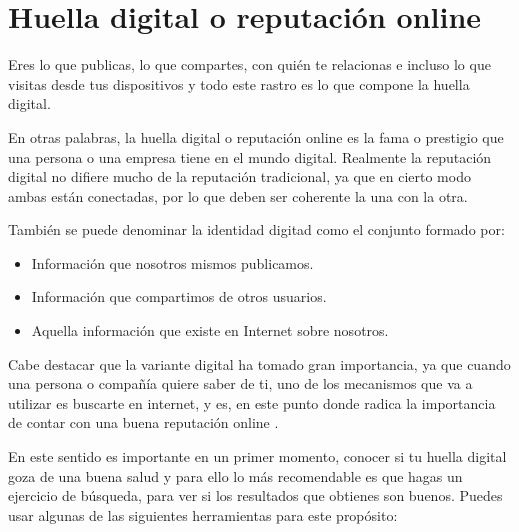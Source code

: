 \documentclass[
  a4paper,
  openany]{book}
\begin{document}
\hypertarget{huella-digital-o-reputaciuxf3n-online}{%
\section{Huella digital o reputación online}\label{huella-digital-o-reputaciuxf3n-online}}

Eres lo que publicas, lo que compartes, con quién te relacionas e incluso lo que visitas desde tus dispositivos y todo este rastro es lo que compone la huella digital.

En otras palabras, la huella digital o reputación online es la fama o prestigio que una persona o una empresa tiene en el mundo digital. Realmente la reputación digital no difiere mucho de la reputación tradicional, ya que en cierto modo ambas están conectadas, por lo que deben ser coherente la una con la otra.

También se puede denominar la identidad digitad como el conjunto formado por:

\begin{itemize}
\item
  Información que nosotros mismos publicamos.
\item
  Información que compartimos de otros usuarios.
\item
  Aquella información que existe en Internet sobre nosotros.
\end{itemize}

Cabe destacar que la variante digital ha tomado gran importancia, ya que cuando una persona o compañía quiere saber de ti, uno de los mecanismos que va a utilizar es buscarte en internet, y es, en este punto donde radica la importancia de contar con una buena reputación online \citep{huella-digital}.

En este sentido es importante en un primer momento, conocer si tu huella digital goza de una buena salud y para ello lo más recomendable es que hagas un ejercicio de búsqueda, para ver si los resultados que obtienes son buenos. Puedes usar algunas de las siguientes herramientas para este propósito:
\end{document}
